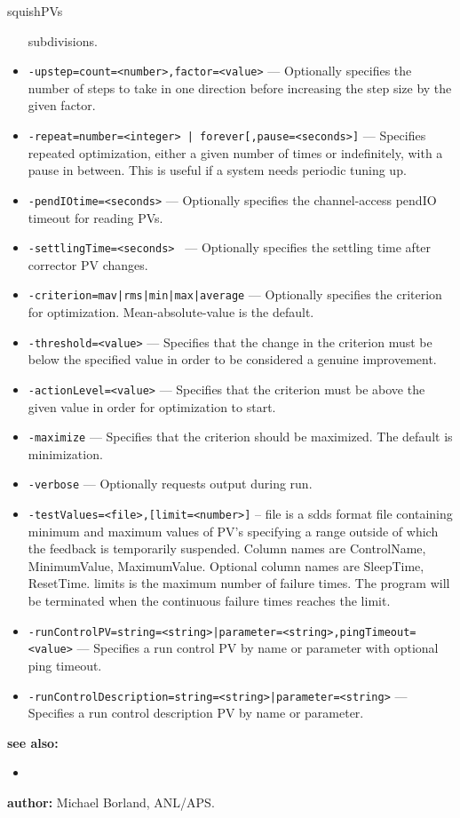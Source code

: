 \begin{sddsprog}{squishPVs}
\begin{itemize}
                     subdivisions.
  \item {\tt -upstep=count=<number>,factor=<value>} --- Optionally specifies the number of steps
                to take in one direction before increasing the step size by the given factor.
  \item {\tt -repeat={number=<integer> | forever}[,pause=<seconds>]} --- Specifies repeated
                optimization, either a given number of times or indefinitely, with a pause in between.
                This is useful if a system needs periodic tuning up.
  \item {\tt -pendIOtime=<seconds>} --- Optionally specifies the channel-access pendIO timeout for reading PVs.
  \item {\tt -settlingTime=<seconds> } --- Optionally specifies the settling time after corrector PV changes.
  \item {\tt -criterion={mav|rms|min|max|average}} --- Optionally specifies the criterion for optimization.
                Mean-absolute-value is the default.
  \item {\tt -threshold=<value>} --- Specifies that the change in the criterion must be below the specified
        value in order to be considered a genuine improvement.
  \item {\tt -actionLevel=<value>} --- Specifies that the criterion must be above the given value
        in order for optimization to start.
  \item {\tt -maximize} --- Specifies that the criterion should be maximized.  The default is
                minimization.
  \item {\tt -verbose} --- Optionally requests output during run.
  \item {\tt -testValues=<file>,[limit=<number>]} --
                     file is a sdds format file containing minimum and maximum values
                     of PV's specifying a range outside of which the feedback
                     is temporarily suspended. Column names are ControlName,
                     MinimumValue, MaximumValue. Optional column names are
                     SleepTime, ResetTime.
                     limits is the maximum number of failure times. The program will be
                     terminated when the continuous failure times reaches the limit.
  \item {\tt -runControlPV={string=<string>|parameter=<string>},pingTimeout=<value>} ---
                    Specifies a run control PV by name or parameter with optional ping timeout.
  \item {\tt -runControlDescription={string=<string>|parameter=<string>}} ---
                    Specifies a run control description PV by name or parameter.
\end{itemize}

\item \textbf{see also:}
\begin{itemize}
  \item {}
\end{itemize}
\item \textbf{author:} Michael Borland, ANL/APS.
\end{sddsprog}
